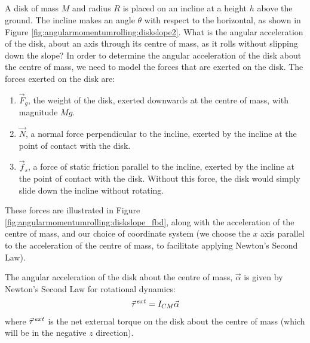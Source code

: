 \\
\\
\\
\\
\vspace{-2cm}
\begin{example}{A disk of mass $M$ and radius $R$ is placed on an incline at a height $h$ above the ground. The incline makes an angle $\theta$ with respect to the horizontal, as shown in Figure \ref{fig:angularmomentumrolling:diskslope2}. What is the angular acceleration of the disk, about an axis through its centre of mass, as it rolls without slipping down the slope?}
In order to determine the angular acceleration of the disk about the centre of mass, we need to model the forces that are exerted on the disk. The forces exerted on the disk are:
\begin{enumerate}
\item $\vec F_g$, the weight of the disk, exerted downwards at the centre of mass, with magnitude $Mg$.
\item $\vec N$, a normal force perpendicular to the incline, exerted by the incline at the point of contact with the disk.
\item $\vec f_s$, a force of static friction parallel to the incline, exerted by the incline at the point of contact with the disk. Without this force, the disk would simply slide down the incline without rotating. 
\end{enumerate}
These forces are illustrated in Figure \ref{fig:angularmomentumrolling:diskslope_fbd}, along with the acceleration of the centre of mass, and our choice of coordinate system (we choose the $x$ axis parallel to the acceleration of the centre of mass, to facilitate applying Newton's Second Law). 

The angular acceleration of the disk about the centre of mass, $\vec \alpha$ is given by Newton's Second Law for rotational dynamics:
\begin{align*}
\pvec\tau^{ext} = I_{CM}\vec\alpha
\end{align*}
where $\pvec\tau^{ext}$ is the net external torque on the disk about the centre of mass (which will be in the negative $z$ direction).


\end{example}
